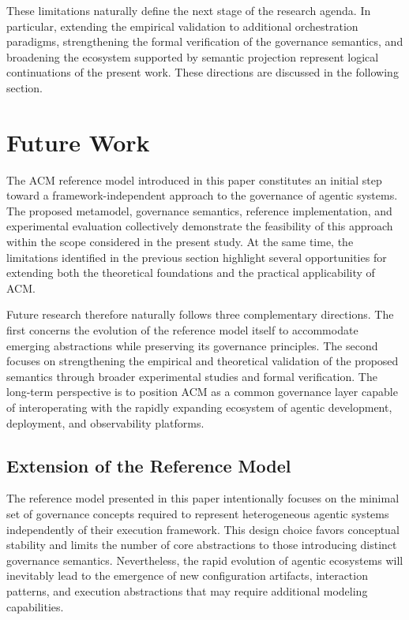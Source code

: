 \documentclass[10pt]{article}
\begin{document}
These limitations naturally define the next stage of the research agenda. In particular, extending the empirical validation to additional orchestration paradigms, strengthening the formal verification of the governance semantics, and broadening the ecosystem supported by semantic projection represent logical continuations of the present work. These directions are discussed in the following section.

\section{Future Work}
\label{sec:future_work}

The ACM reference model introduced in this paper constitutes an initial step toward a framework-independent approach to the governance of agentic systems. The proposed metamodel, governance semantics, reference implementation, and experimental evaluation collectively demonstrate the feasibility of this approach within the scope considered in the present study. At the same time, the limitations identified in the previous section highlight several opportunities for extending both the theoretical foundations and the practical applicability of ACM.

Future research therefore naturally follows three complementary directions. The first concerns the evolution of the reference model itself to accommodate emerging abstractions while preserving its governance principles. The second focuses on strengthening the empirical and theoretical validation of the proposed semantics through broader experimental studies and formal verification. The long-term perspective is to position ACM as a common governance layer capable of interoperating with the rapidly expanding ecosystem of agentic development, deployment, and observability platforms.

\subsection{Extension of the Reference Model}
\label{sec:future_reference_model}

The reference model presented in this paper intentionally focuses on the minimal set of governance concepts required to represent heterogeneous agentic systems independently of their execution framework. This design choice favors conceptual stability and limits the number of core abstractions to those introducing distinct governance semantics. Nevertheless, the rapid evolution of agentic ecosystems will inevitably lead to the emergence of new configuration artifacts, interaction patterns, and execution abstractions that may require additional modeling capabilities.
\end{document}
